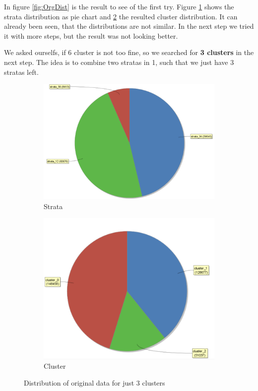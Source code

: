 In figure \ref{fig:OrgDist} is the result to see of the first try. Figure \ref{fig:OrgSt} shows the strata distribution as pie chart and \ref{fig:OrgCl} the resulted cluster distribution. It can already been seen, that the distributions are not similar. In the next step we tried it with more steps, but the result was not looking better.

We asked ourselfs, if 6 cluster is not too fine, so we searched for \textbf{3 clusters} in the next step. The idea is to combine two stratas in 1, such that we just have 3 stratas left.
\begin{figure}[!htbp]
\centering
\begin{subfigure}{.5\textwidth}
  \centering
  \includegraphics[width=.8\linewidth]{ClusterOrigRapidStrata2Cluster.PNG}
  \caption{Strata}
  \label{fig:OrgSt}
\end{subfigure}%
\begin{subfigure}{.5\textwidth}
  \centering
  \includegraphics[width=.8\linewidth]{ClusterOrigRapidCluster2Cluster.PNG}
  \caption{Cluster}
  \label{fig:OrgCl}
\end{subfigure}
\caption{Distribution of original data for just 3 clusters}
\label{fig:OrgDist3Cl}
\end{figure}

